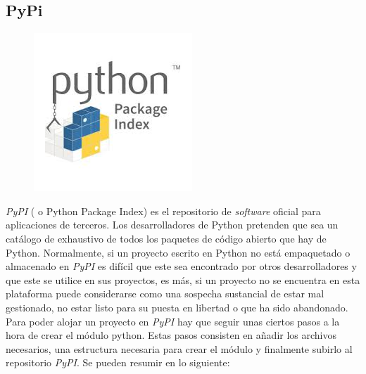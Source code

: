 \documentclass[a4paper, 12pt]{book}
\begin{document}
\subsection{PyPi}
\label{subsec:pypi}
\begin{figure}[h]
    \centering
    \includegraphics[scale=0.5]{img/logo_pypi.jpg}
    \label{fig:logoPypi}
\end{figure}
\emph{PyPI} ( o Python Package Index) es el repositorio de \emph{software} oficial  para aplicaciones de terceros. Los desarrolladores de Python pretenden que sea un catálogo de exhaustivo de todos los paquetes de código abierto que hay de Python. Normalmente, si un proyecto escrito en Python no está empaquetado o almacenado en \emph{PyPI}  es difícil que este sea encontrado por otros desarrolladores y que este se utilice en sus proyectos, es más, si un proyecto no se encuentra en esta plataforma puede considerarse como una sospecha sustancial de estar mal gestionado, no estar listo para su puesta en libertad o que ha sido abandonado.  \\
Para poder alojar un proyecto en \emph{PyPI} hay que seguir unas ciertos pasos a la hora de crear  el módulo python. Estas pasos consisten en añadir los archivos necesarios, una estructura necesaria para crear el módulo y finalmente subirlo al repositorio \emph{PyPI}. Se pueden resumir en lo siguiente:
\end{document}
